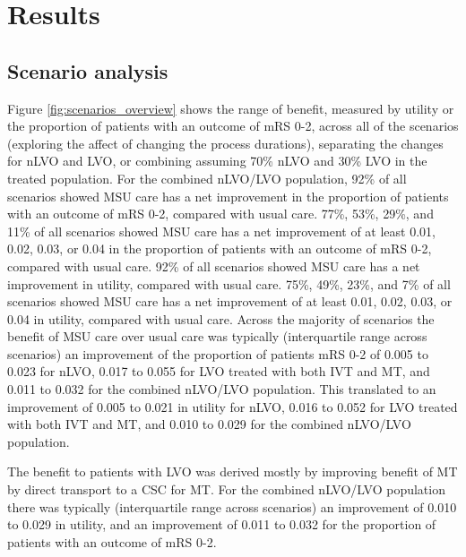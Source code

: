 \section{Results}

\subsection{Scenario analysis}

Figure \ref{fig:scenarios_overview} shows the range of benefit, measured by utility or the proportion of patients with an outcome of mRS 0-2, across all of the scenarios (exploring the affect of changing the process durations), separating the changes for nLVO and LVO, or combining assuming 70\% nLVO and 30\% LVO in the treated population. For the combined nLVO/LVO population, 92\% of all scenarios showed MSU care has a net improvement in the proportion of patients with an outcome of mRS 0-2, compared with usual care. 77\%, 53\%, 29\%, and 11\% of all scenarios showed MSU care has a net improvement of at least 0.01, 0.02, 0.03, or 0.04 in the proportion of patients with an outcome of mRS 0-2, compared with usual care. 92\% of all scenarios showed MSU care has a net improvement in utility, compared with usual care. 75\%, 49\%, 23\%, and 7\% of all scenarios showed MSU care has a net improvement of at least 0.01, 0.02, 0.03, or 0.04 in utility, compared with usual care. Across the majority of scenarios the benefit of MSU care over usual care was typically (interquartile range across scenarios) an improvement of the proportion of patients mRS 0-2 of 0.005 to 0.023 for nLVO, 0.017 to 0.055 for LVO treated with both IVT and MT, and 0.011 to 0.032 for the combined nLVO/LVO population. This translated to an improvement of 0.005 to 0.021 in utility for nLVO, 0.016 to 0.052 for LVO treated with both IVT and MT, and 0.010 to 0.029 for the combined nLVO/LVO population. 

The benefit to patients with LVO was derived mostly by improving benefit of MT by direct transport to a CSC for MT. For the combined nLVO/LVO population there was typically (interquartile range across scenarios) an improvement of 0.010 to 0.029 in utility, and an improvement of 0.011 to 0.032 for the proportion of patients with an outcome of mRS 0-2.

